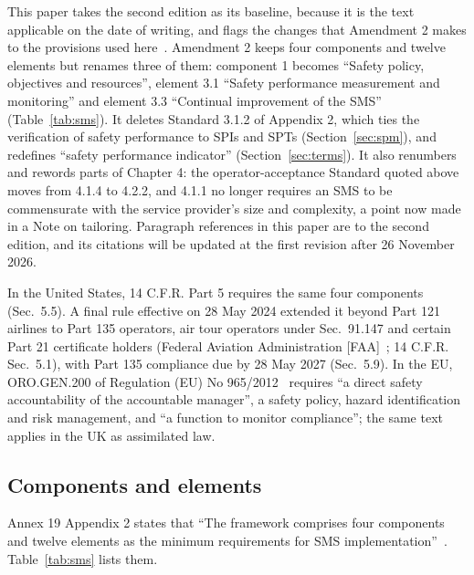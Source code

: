 \documentclass[11pt]{article}
\begin{document}
This paper takes the second edition as its baseline, because it is the text applicable on the date of writing, and flags the changes that Amendment 2 makes to the provisions used here~\cite{icao2025amdt2}. Amendment 2 keeps four components and twelve elements but renames three of them: component 1 becomes ``Safety policy, objectives and resources'', element 3.1 ``Safety performance measurement and monitoring'' and element 3.3 ``Continual improvement of the SMS'' (Table~\ref{tab:sms}). It deletes Standard 3.1.2 of Appendix 2, which ties the verification of safety performance to SPIs and SPTs (Section~\ref{sec:spm}), and redefines ``safety performance indicator'' (Section~\ref{sec:terms}). It also renumbers and rewords parts of Chapter 4: the operator-acceptance Standard quoted above moves from 4.1.4 to 4.2.2, and 4.1.1 no longer requires an SMS to be commensurate with the service provider's size and complexity, a point now made in a Note on tailoring. Paragraph references in this paper are to the second edition, and its citations will be updated at the first revision after 26 November 2026.

In the United States, 14 C.F.R. Part 5 requires the same four components (Sec.~5.5). A final rule effective on 28 May 2024 extended it beyond Part 121 airlines to Part 135 operators, air tour operators under Sec.~91.147 and certain Part 21 certificate holders (Federal Aviation Administration {[}FAA{]}~\cite{faa2024sms}; 14 C.F.R. Sec.~5.1), with Part 135 compliance due by 28 May 2027 (Sec.~5.9). In the EU, ORO.GEN.200 of Regulation (EU) No 965/2012~\cite{reg2012_965} requires ``a direct safety accountability of the accountable manager'', a safety policy, hazard identification and risk management, and ``a function to monitor compliance''; the same text applies in the UK as assimilated law.

\subsection{Components and elements}\label{sec:components}

Annex 19 Appendix 2 states that ``The framework comprises four components and twelve elements as the minimum requirements for SMS implementation''~\cite{icao2016annex19}. Table~\ref{tab:sms} lists them.
\end{document}
